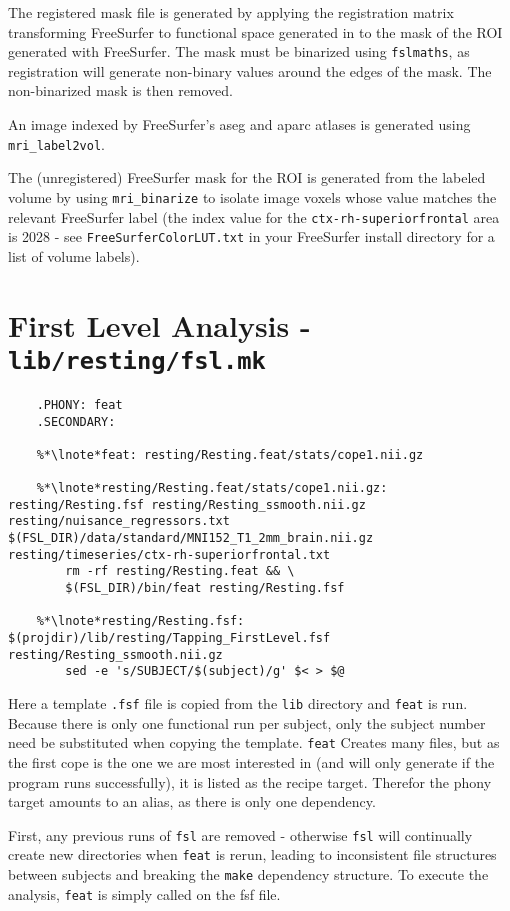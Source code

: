 The registered mask file is generated by applying the registration matrix transforming FreeSurfer to functional space generated in  to the mask of the ROI generated with FreeSurfer. The mask must be binarized using \texttt{fslmaths}, as registration will generate non-binary values around the edges of the mask. The non-binarized mask is then removed.

An image indexed by FreeSurfer's aseg and aparc atlases is generated using \texttt{mri_label2vol}.

The (unregistered) FreeSurfer mask for the ROI is generated from the labeled volume by using \texttt{mri_binarize} to isolate image voxels whose value matches the relevant FreeSurfer label (the index value for the \texttt{ctx-rh-superiorfrontal} area is 2028 - see \texttt{FreeSurferColorLUT.txt} in your FreeSurfer install directory for a list of volume labels).

\section{First Level Analysis - \texttt{lib/resting/fsl.mk}}
\begin{lstlisting}
	.PHONY: feat
	.SECONDARY:
	
	%*\lnote*feat: resting/Resting.feat/stats/cope1.nii.gz
	
	%*\lnote*resting/Resting.feat/stats/cope1.nii.gz: resting/Resting.fsf resting/Resting_ssmooth.nii.gz resting/nuisance_regressors.txt $(FSL_DIR)/data/standard/MNI152_T1_2mm_brain.nii.gz resting/timeseries/ctx-rh-superiorfrontal.txt
		rm -rf resting/Resting.feat && \
		$(FSL_DIR)/bin/feat resting/Resting.fsf
	
	%*\lnote*resting/Resting.fsf: $(projdir)/lib/resting/Tapping_FirstLevel.fsf resting/Resting_ssmooth.nii.gz
		sed -e 's/SUBJECT/$(subject)/g' $< > $@
\end{lstlisting}
Here a template \texttt{.fsf} file is copied from the \texttt{lib} directory and \texttt{feat} is run. Because there is only one functional run per subject, only the subject number need be substituted when copying the template.
\lnum{41}\texttt{feat} Creates many files, but as the first cope is the one we are most interested in (and will only generate if the program runs successfully), it is listed as the recipe target. Therefor the phony target amounts to an alias, as there is only one dependency.

First, any previous runs of \texttt{fsl} are removed - otherwise \texttt{fsl} will continually create new directories when \texttt{feat} is rerun, leading to inconsistent file structures between subjects and breaking the \texttt{make} dependency structure. To execute the analysis, \texttt{feat} is simply called on the fsf file. 

